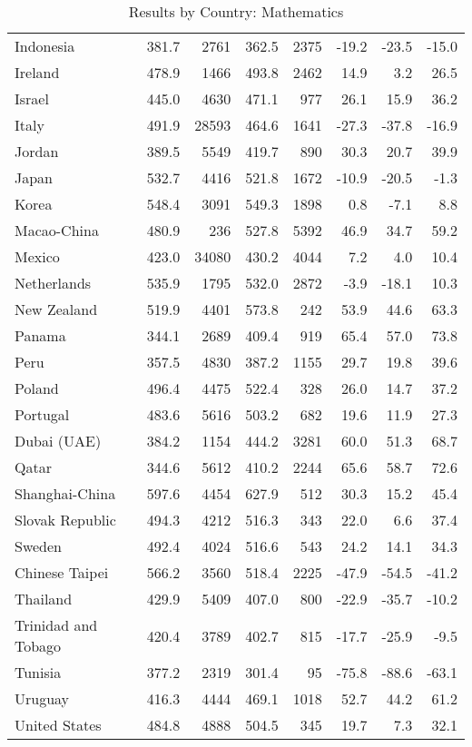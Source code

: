 \begin{table}[ht]
\begin{center}
{\begin{tabular}{lrr@{\extracolsep{10pt}}rr@{\extracolsep{10pt}}rrr}
  Indonesia & 381.7 & 2761 & 362.5 & 2375 & -19.2 & -23.5 & -15.0 \\ 
  Ireland & 478.9 & 1466 & 493.8 & 2462 & 14.9 & 3.2 & 26.5 \\ 
  Israel & 445.0 & 4630 & 471.1 & 977 & 26.1 & 15.9 & 36.2 \\ 
  Italy & 491.9 & 28593 & 464.6 & 1641 & -27.3 & -37.8 & -16.9 \\ 
  Jordan & 389.5 & 5549 & 419.7 & 890 & 30.3 & 20.7 & 39.9 \\ 
  Japan & 532.7 & 4416 & 521.8 & 1672 & -10.9 & -20.5 & -1.3 \\ 
  Korea & 548.4 & 3091 & 549.3 & 1898 & 0.8 & -7.1 & 8.8 \\ 
  Macao-China & 480.9 & 236 & 527.8 & 5392 & 46.9 & 34.7 & 59.2 \\ 
  Mexico & 423.0 & 34080 & 430.2 & 4044 & 7.2 & 4.0 & 10.4 \\ 
  Netherlands & 535.9 & 1795 & 532.0 & 2872 & -3.9 & -18.1 & 10.3 \\ 
  New Zealand & 519.9 & 4401 & 573.8 & 242 & 53.9 & 44.6 & 63.3 \\ 
  Panama & 344.1 & 2689 & 409.4 & 919 & 65.4 & 57.0 & 73.8 \\ 
  Peru & 357.5 & 4830 & 387.2 & 1155 & 29.7 & 19.8 & 39.6 \\ 
  Poland & 496.4 & 4475 & 522.4 & 328 & 26.0 & 14.7 & 37.2 \\ 
  Portugal & 483.6 & 5616 & 503.2 & 682 & 19.6 & 11.9 & 27.3 \\ 
  Dubai (UAE) & 384.2 & 1154 & 444.2 & 3281 & 60.0 & 51.3 & 68.7 \\ 
  Qatar & 344.6 & 5612 & 410.2 & 2244 & 65.6 & 58.7 & 72.6 \\ 
  Shanghai-China & 597.6 & 4454 & 627.9 & 512 & 30.3 & 15.2 & 45.4 \\ 
  Slovak Republic & 494.3 & 4212 & 516.3 & 343 & 22.0 & 6.6 & 37.4 \\ 
  Sweden & 492.4 & 4024 & 516.6 & 543 & 24.2 & 14.1 & 34.3 \\ 
  Chinese Taipei & 566.2 & 3560 & 518.4 & 2225 & -47.9 & -54.5 & -41.2 \\ 
  Thailand & 429.9 & 5409 & 407.0 & 800 & -22.9 & -35.7 & -10.2 \\ 
  Trinidad and Tobago & 420.4 & 3789 & 402.7 & 815 & -17.7 & -25.9 & -9.5 \\ 
  Tunisia & 377.2 & 2319 & 301.4 & 95 & -75.8 & -88.6 & -63.1 \\ 
  Uruguay & 416.3 & 4444 & 469.1 & 1018 & 52.7 & 44.2 & 61.2 \\ 
  United States & 484.8 & 4888 & 504.5 & 345 & 19.7 & 7.3 & 32.1 \\ 
   \hline
\end{tabular}
}
\caption{Results by Country: Mathematics}
\label{level2math}
\end{center}
\end{table}
